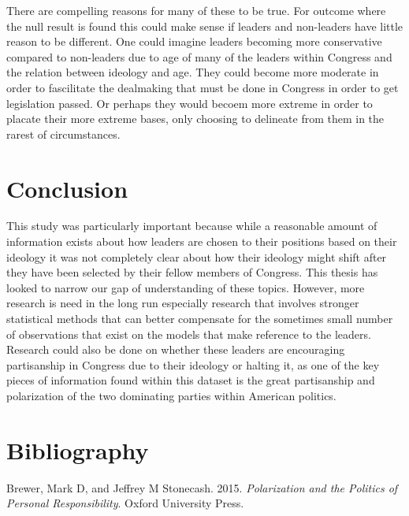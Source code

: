 \documentclass[12pt,twoside]{reedthesis}
\begin{document}
  There are compelling reasons for many of these to be true. For outcome
  where the null result is found this could make sense if leaders and
  non-leaders have little reason to be different. One could imagine
  leaders becoming more conservative compared to non-leaders due to age of
  many of the leaders within Congress and the relation between ideology
  and age. They could become more moderate in order to fascilitate the
  dealmaking that must be done in Congress in order to get legislation
  passed. Or perhaps they would becoem more extreme in order to placate
  their more extreme bases, only choosing to delineate from them in the
  rarest of circumstances.
  
  \chapter*{Conclusion}\label{conclusion-1}
  
  \setcounter{chapter}{4} \setcounter{section}{0}
  
  This study was particularly important because while a reasonable amount
  of information exists about how leaders are chosen to their positions
  based on their ideology it was not completely clear about how their
  ideology might shift after they have been selected by their fellow
  members of Congress. This thesis has looked to narrow our gap of
  understanding of these topics. However, more research is need in the
  long run especially research that involves stronger statistical methods
  that can better compensate for the sometimes small number of
  observations that exist on the models that make reference to the
  leaders. Research could also be done on whether these leaders are
  encouraging partisanship in Congress due to their ideology or halting
  it, as one of the key pieces of information found within this dataset is
  the great partisanship and polarization of the two dominating parties
  within American politics.
  
  \backmatter
  
  \chapter{Bibliography}\label{bibliography}
  
  \noindent
  
  \setlength{\parindent}{-0.20in} \setlength{\leftskip}{0.20in}
  \setlength{\parskip}{8pt}
  
  Brewer, Mark D, and Jeffrey M Stonecash. 2015. \emph{Polarization and
  the Politics of Personal Responsibility}. Oxford University Press.
  
\end{document}
